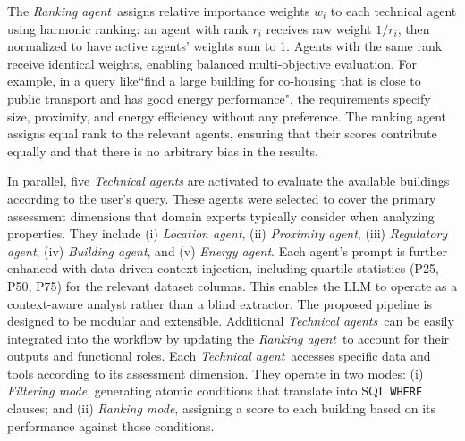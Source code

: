 \documentclass[runningheads,orivec]{llncs}
\newcommand{\rankingagent}{\textit{Ranking agent}}
\newcommand{\technicalagent}{\textit{Technical agent}}
\newcommand{\technicalagents}{\textit{Technical agents}}
\newcommand{\locationagent}{\textit{Location agent}}
\newcommand{\energyagent}{\textit{Energy agent}}
\newcommand{\proximityagent}{\textit{Proximity agent}}
\newcommand{\regulatoryagent}{\textit{Regulatory agent}}
\newcommand{\buildingagent}{\textit{Building agent}}
\newcommand{\filteringmode}{\textit{Filtering mode}}
\newcommand{\rankingmode}{\textit{Ranking mode}}
\begin{document}
The \rankingagent\ assigns relative importance weights $w_i$ to each technical agent using harmonic ranking: an agent with rank $r_i$ receives raw weight $1/r_i$, then normalized to have active agents' weights sum to 1.
Agents with the same rank receive identical weights, enabling balanced multi-objective evaluation. For example, in a query like``find a large building for co-housing that is close to public transport and has good energy performance", the requirements specify size, proximity, and energy efficiency without any preference. The ranking agent assigns equal rank to the relevant agents, ensuring that their scores contribute equally and that there is no arbitrary bias in the results.




In parallel, five \textit{Technical agents} are activated to evaluate the available buildings according to the user’s query.
These agents were selected to cover the primary assessment dimensions that domain experts typically consider when analyzing properties. They include
(i) \locationagent, (ii) \proximityagent, (iii) \regulatoryagent, (iv) \buildingagent, and (v) \energyagent.
Each agent's prompt is further enhanced with data-driven context injection, including quartile statistics (P25, P50, P75) for the relevant dataset columns. This enables the LLM to operate as a context-aware analyst rather than a blind extractor.
The proposed pipeline is designed to be modular and extensible.
Additional \technicalagents\ can be easily integrated into the workflow by updating the \rankingagent\ to account for their outputs and functional roles.
Each \technicalagent\ accesses specific data and tools according to its assessment dimension. They operate in two modes: (i) \filteringmode, generating atomic conditions that translate into SQL \texttt{WHERE} clauses; and (ii) \rankingmode, assigning a score to each building based on its performance against those conditions. \\
\end{document}
